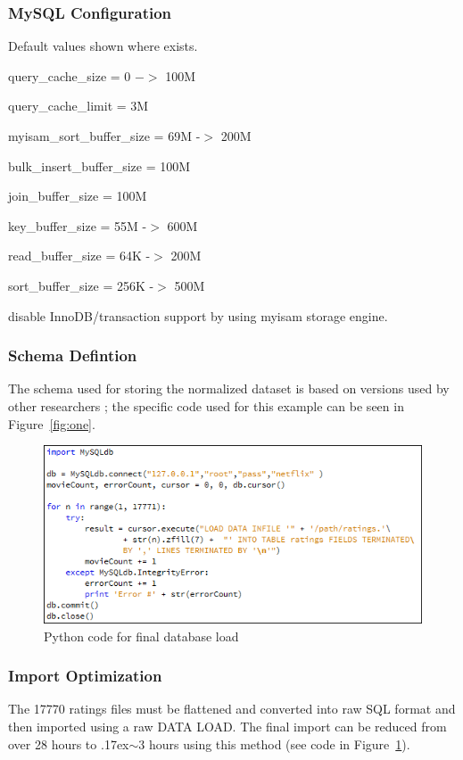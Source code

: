 \documentclass{acmtog}
\newcommand{\indentitem}{\setlength\itemindent{25pt}}
\begin{document}
\subsubsection{MySQL Configuration} Default values shown where exists.
\begin{itemize}
	{\indentitem\item query\_cache\_size = 0 $->$ 100M}
	{\indentitem\item query\_cache\_limit = 3M}
	{\indentitem\item myisam\_sort\_buffer\_size = 69M -$>$ 200M}
	{\indentitem\item bulk\_insert\_buffer\_size = 100M}
	{\indentitem\item join\_buffer\_size = 100M}
	{\indentitem\item key\_buffer\_size = 55M -$>$ 600M}
	{\indentitem\item read\_buffer\_size = 64K -$>$ 200M}
	{\indentitem\item sort\_buffer\_size = 256K -$>$ 500M}
	{\indentitem\item disable InnoDB/transaction support by using myisam storage engine.}
\end{itemize}

\subsubsection{Schema Defintion}
The schema used for storing the normalized dataset is based on versions used by other researchers \cite{igvita-01}; the specific code used for this example can be seen in Figure~\ref{fig:one}.

\begin{figure}
\centerline{\includegraphics[scale=.6]{04load.png}}
\caption{Python code for final database load}
\label{fig:two}
\end{figure}

\subsubsection{Import Optimization}
The 17770 ratings files must be flattened and converted into raw SQL format and then imported using a raw DATA LOAD. The final import can be reduced from over 28 hours to {\raise.17ex\hbox{$\scriptstyle\mathtt{\sim}$}}3 hours using this method (see code in Figure~\ref{fig:two}).
\end{document}
